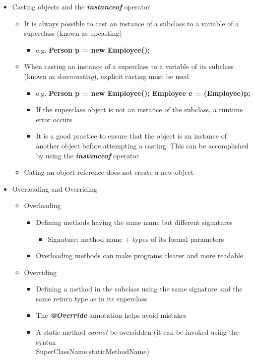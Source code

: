 \begin{itemize}
	\item Casting objects and the \textit{\textbf{instanceof}} operator
	\begin{itemize}
		\item It is always possible to cast an instance of a subclass to a variable of a superclass (known as upcasting)
		\begin{itemize}
			\item e.g. \textbf{Person p = new Employee();}
		\end{itemize}
		\item When casting an instance of a superclass to a variable of its subclass (known as \textit{downcasting}), explicit casting must be used
		\begin{itemize}
			\item e.g. \textbf{Person p = new Employee(); Employee e = (Employee)p;}
			\item If the superclass object is not an instance of the subclass, a runtime error occurs
			\item  It is a good practice to ensure that the object is an instance of another object before attempting a casting. This can be accomplished by using the \textit{\textbf{instanceof}} operator
		\end{itemize}
		\item Cating an object reference does not create a new object
	\end{itemize}

	\item Overloading and Overriding
	\begin{itemize}
		\item Overloading
		\begin{itemize}
			\item Defining methods having the same name but different signatures
			\begin{itemize}
				\item Signature: method name + types of its formal parameters
			\end{itemize}
			\item Overloading methods can make programs clearer and more readable
		\end{itemize}
		\item Overriding
		\begin{itemize}
			\item Defining a method in the subclass using the same signature and the same
			return type as in its superclass
			\item The \textbf{\textit{@Override}} annotation helps avoid mistakes
			\item A static method \textit{cannot} be overridden (it can be invoked using the syntax\\
			SuperClassName.staticMethodName)
		\end{itemize}
	\end{itemize}


\end{itemize}

